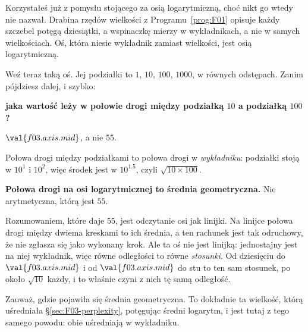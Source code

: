 \begin{fr}
Korzystałeś już z pomysłu stojącego za osią logarytmiczną, choć nikt go
wtedy nie nazwał. Drabina rzędów wielkości z Programu~\ref{prog:F01} opisuje
każdy szczebel potęgą dziesiątki, a wspinaczkę mierzy w wykładnikach, a nie w
samych wielkościach. Oś, która niesie wykładnik zamiast wielkości, jest osią
logarytmiczną.

Weź teraz taką oś. Jej podziałki to $1$, $10$, $100$, $1000$, w równych
odstępach. Zanim pójdziesz dalej, i szybko:

\textbf{jaka wartość leży w połowie drogi między podziałką $10$ a podziałką
$100$?}
\dotline
\nextframe
\end{fr}

\begin{fr}
\begin{ansblock}
$\val{f03.axis.mid}$, a nie $55$.

Połowa drogi między podziałkami to połowa drogi w \emph{wykładniku}: podziałki
stoją w $10^{1}$ i $10^{2}$, więc środek jest w $10^{\num{1.5}}$, czyli
$\sqrt{10 \times 100}$.
\end{ansblock}

\begin{trapbox}
\textbf{Połowa drogi na osi logarytmicznej to średnia geometryczna.} Nie
arytmetyczna, którą jest $55$.

Rozumowaniem, które daje $55$, jest odczytanie osi jak linijki. Na linijce
połowa drogi między dwiema kreskami to ich średnia, a ten rachunek jest tak
odruchowy, że nie zgłasza się jako wykonany krok. Ale ta oś nie jest linijką:
jednostajny jest na niej wykładnik, więc równe odległości to równe
\emph{stosunki}. Od dziesięciu do $\val{f03.axis.mid}$ i od
$\val{f03.axis.mid}$ do stu to ten sam stosunek, po około $\sqrt{10}$ każdy, i
to właśnie czyni z nich tę samą odległość.

Zauważ, gdzie pojawiła się średnia geometryczna. To dokładnie ta wielkość,
którą uśredniała \S\ref{sec:F03-perplexity}, potęgując średni logarytm, i jest
tutaj z tego samego powodu: obie uśredniają w wykładniku.
\end{trapbox}
\end{fr}


